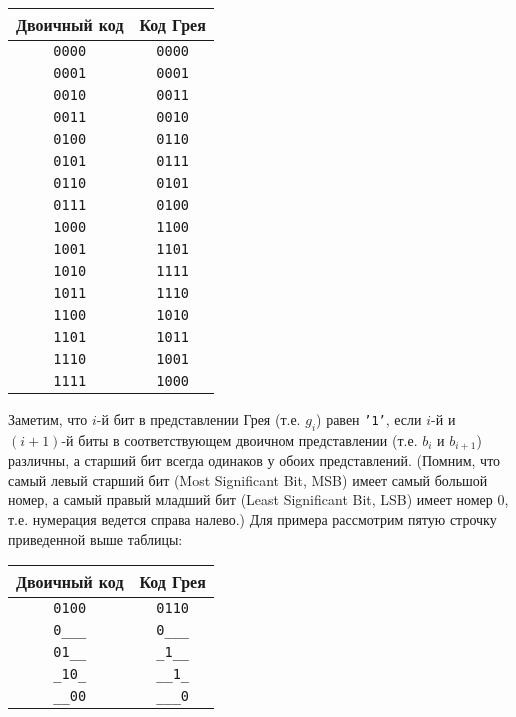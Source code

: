 \begin{table}[h]
\centering
\begin{tabular}{|c|c|}
\hline
Двоичный код  & Код Грея      \\ \hline
\texttt{0000} & \texttt{0000} \\
\texttt{0001} & \texttt{0001} \\
\texttt{0010} & \texttt{0011} \\
\texttt{0011} & \texttt{0010} \\
\texttt{0100} & \texttt{0110} \\
\texttt{0101} & \texttt{0111} \\
\texttt{0110} & \texttt{0101} \\
\texttt{0111} & \texttt{0100} \\
\texttt{1000} & \texttt{1100} \\
\texttt{1001} & \texttt{1101} \\
\texttt{1010} & \texttt{1111} \\
\texttt{1011} & \texttt{1110} \\
\texttt{1100} & \texttt{1010} \\
\texttt{1101} & \texttt{1011} \\
\texttt{1110} & \texttt{1001} \\
\texttt{1111} & \texttt{1000} \\
\hline
\end{tabular}
\end{table}
 
Заметим, что $i$-й бит в представлении Грея (т.е. $g_i$) равен \texttt{'1'}, если $i$-й и $(i+1)$-й биты в соответствующем двоичном представлении (т.е. $b_i$ и $b_{i+1}$) различны, а старший бит всегда одинаков у обоих представлений. (Помним, что самый левый старший бит (Most Significant Bit, MSB) имеет самый большой номер, а самый правый младший бит (Least Significant Bit, LSB) имеет номер 0, т.е. нумерация ведется справа налево.) Для примера рассмотрим пятую строчку приведенной выше таблицы:

\begin{table}[h]
\centering
\begin{tabular}{|c|c|}
\hline
Двоичный код     & Код Грея         \\ \hline
\texttt{0100}    & \texttt{0110}    \\ \hline
\texttt{0\_\_\_} & \texttt{0\_\_\_} \\
\texttt{01\_\_}  & \texttt{\_1\_\_} \\
\texttt{\_10\_}  & \texttt{\_\_1\_} \\
\texttt{\_\_00}  & \texttt{\_\_\_0} \\
\hline
\end{tabular}
\end{table}

